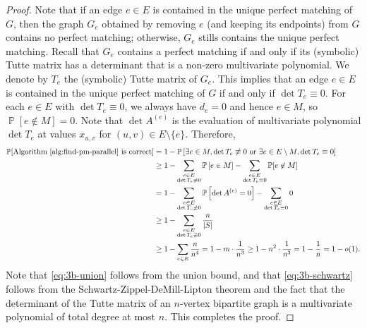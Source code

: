\documentclass[letterpaper, reqno,11pt]{article}
\newcommand{\PP}{\mathop{{}\mathbb{P}}}
\begin{document}
\begin{enumerate}
\begin{enumerate}
\begin{proof}
      Note that if an edge $e \in E$ is contained in the unique perfect matching of $G$, then the graph $G_e$ obtained by removing $e$ (and keeping its endpoints) from $G$ contains no perfect matching; otherwise, $G_e$ stills contains the unique perfect matching. Recall that $G_e$ contains a perfect matching if and only if its (symbolic) Tutte matrix has a determinant that is a non-zero multivariate polynomial. We denote by $T_e$ the (symbolic) Tutte matrix of $G_e$. This implies that an edge $e \in E$ is contained in the unique perfect matching of $G$ if and only if $\det T_e \equiv 0$. For each $e \in E$ with $\det T_e \equiv 0$, we always have $d_e = 0$ and hence $e \in M$, so $\PP[e \not \in M] = 0$. Note that $\det A^{(e)}$ is the evaluation of multivariate polynomial $\det T_e$ at values $x_{u, v}$ for $(u, v) \in E \setminus \{ e \}$. Therefore,
      \begin{align}
        \PP[\text{Algorithm \ref{alg:find-pm-parallel} is correct}] &= 1 - \PP\left[\text{$\exists e \in M, \det T_e \not\equiv 0$ or $\exists e \in E \setminus M, \det T_e \equiv 0$}\right] \nonumber \\
        &\geq 1 - \sum_{\substack{e \in E \\ \det T_e \not\equiv 0}} \PP\left[e \in M\right] - \sum_{\substack{e \in E \\ \det T_e \equiv 0}} \PP[e \not \in M] \label{eq:3b-union} \\
        &= 1 - \sum_{\substack{e \in E \\ \det T_e \not\equiv 0}} \PP\left[\det A^{(e)} = 0\right] - \sum_{\substack{e \in E \\ \det T_e \equiv 0}} 0 \nonumber \\
        &\geq 1 - \sum_{\substack{e \in E \\ \det T_e \not\equiv 0}} \frac{n}{|S|} \label{eq:3b-schwartz} \\
        &\geq 1 - \sum_{e \in E} \frac{n}{n^4} \nonumber = 1 - m \cdot \frac{1}{n^3} \geq 1 - n^2 \cdot \frac{1}{n^3} = 1 - \frac{1}{n} = 1 - o(1). \nonumber
      \end{align}
      Note that \eqref{eq:3b-union} follows from the union bound, and that \eqref{eq:3b-schwartz} follows from the Schwartz-Zippel-DeMill-Lipton theorem and the fact that the determinant of the Tutte matrix of an $n$-vertex bipartite graph is a multivariate polynomial of total degree at most $n$. This completes the proof.
    \end{proof}

    \clearpage


\end{enumerate}
\end{enumerate}
\end{document}
